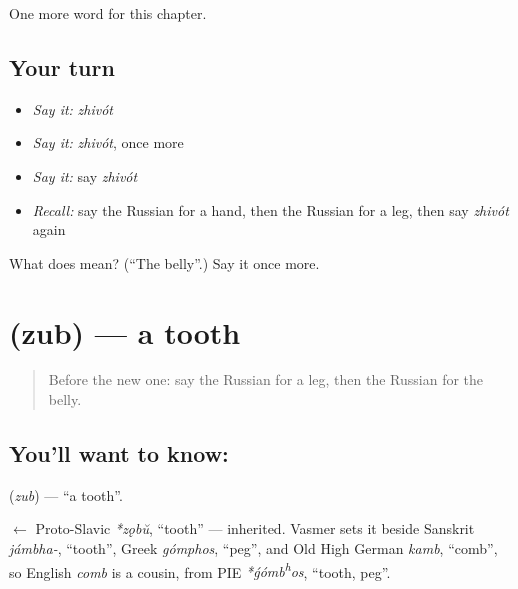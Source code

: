 \begin{grammarlens}[title={What you've built}]
One more word for this chapter.
\end{grammarlens}

\subsection*{Your turn}
\begin{itemize}
\raggedright
  \item \emph{Say it:} \emph{zhivót}
  \item \emph{Say it:} \emph{zhivót}, once more
  \item \emph{Say it:} say \emph{zhivót}
  \item \emph{Recall:} say the Russian for a hand, then the Russian for a leg, then say \emph{zhivót} again
\end{itemize}

\begin{tcolorbox}[breakable,colback=teal!4,colframe=teal!35!black,title={Before you move on}]
What does  mean? (\textquotedblleft{}The belly\textquotedblright{}.) Say it once more.
\end{tcolorbox}
\section[\texorpdfstring{\ru{зуб} (zub)}{зуб (zub)}]{ (zub) — a tooth}

\label{lesson:RU-C29-tooth}



\begin{quote}
Before the new one: say the Russian for a leg, then the Russian for the belly.
\end{quote}

\subsection*{You'll want to know: }
\textbf{} (\emph{zub}) — \textquotedblleft{}a tooth\textquotedblright{}.

\begin{cousinweb}
\textbf{} $\leftarrow$ Proto-Slavic \emph{*zǫbŭ}, \textquotedblleft{}tooth\textquotedblright{} — inherited. Vasmer sets it beside Sanskrit \emph{jámbha-}, \textquotedblleft{}tooth\textquotedblright{}, Greek \emph{gómphos}, \textquotedblleft{}peg\textquotedblright{}, and Old High German \emph{kamb}, \textquotedblleft{}comb\textquotedblright{}, so English \emph{comb} is a cousin, from PIE \emph{*ǵómb\textsuperscript{h}os}, \textquotedblleft{}tooth, peg\textquotedblright{}.
\end{cousinweb}


